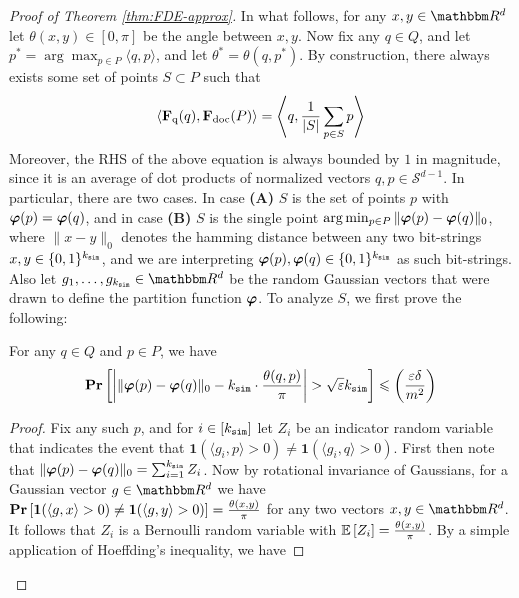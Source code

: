 \begin{proof}[Proof of Theorem \ref{thm:FDE-approx}]
 In what follows, for any $x,y \in \R^d$ let $\theta(x,y) \in [0, \pi]$ be the angle between $x,y$.  Now fix any $q \in Q$, and let $p^* = \arg \max_{p \in P} \langle q,p\rangle$, and let $\theta^* = \theta(q,p^*)$.  By construction, there always exists some set of points $S \subset P$ such that 
\[\langle \mathbf{F}_{\text{q}}(q) , \mathbf{F}_{\text{doc}}(P) \rangle  =\left\langle q, \frac{1}{|S|} \sum_{p \in S} p \right\rangle \] 
Moreover, the RHS of the above equation is always bounded by $1$ in magnitude, since it is an average of dot products of normalized vectors $q,p \in \mathcal{S}^{d-1}$. In particular, there are two cases. In case \textbf{(A)} $S$ is the set of points $p$ with $\boldsymbol{\varphi}(p) = \boldsymbol{\varphi}(q)$, and in case \textbf{(B)} $S$ is the single point $\arg \min_{p \in P} \|\boldsymbol{\varphi}(p) - \boldsymbol{\varphi}(q)\|_0$, where $\|x-y\|_0$ denotes the hamming distance between any two bit-strings $x,y \in \{0,1\}^{k_{\texttt{sim}}}$, and we are interpreting $\boldsymbol{\varphi}(p), \boldsymbol{\varphi}(q)\in \{0,1\}^{k_{\texttt{sim}}}$ as such bit-strings. Also let $g_1,\dots,g_{\ksim} \in \R^d$ be the random Gaussian vectors that were drawn to define the partition function $\boldsymbol{\varphi}$.  To analyze $S$, we first prove the following:
\begin{claim}\label{claim:inner1}
 For any $q \in Q$ and $p \in P$, we have 
 \[\operatorname{{\bf Pr}}\left[ \left| \|\boldsymbol{\varphi}(p) - \boldsymbol{\varphi}(q)\|_0 -  k_{\texttt{sim}} \cdot \frac{\theta(q,p)}{\pi} \right|  >  \sqrt{\varepsilon} k_{\texttt{sim}} \right] \leqslant \left(\frac{\varepsilon\delta }{m^2}\right) \]
\end{claim}
\begin{proof}
Fix any such $p$, and for $i \in [k_{\texttt{sim}}]$ let $Z_i$ be an indicator random variable that indicates the event that $ \mathbf{1}(\langle g_i , p\rangle > 0) \neq \mathbf{1}(\langle g_i , q\rangle > 0)$. 
First then note that $\|\boldsymbol{\varphi}(p) - \boldsymbol{\varphi}(q)\|_0 =\sum_{i=1}^{k_{\texttt{sim}}} Z_i$. Now by rotational invariance of Gaussians, for a Gaussian vector $g \in \R^d$  we have $\operatorname{{\bf Pr}}\left[ \mathbf{1}(\langle g, x\rangle > 0) \neq \mathbf{1}(\langle g, y\rangle> 0) \right] = \frac{\theta(x,y)}{\pi}$ for any two vectors $x,y \in \R^d$. It follows that $Z_i$ is a Bernoulli random variable with $\mathop{ \mathbb{E}\left[ Z_i \right]} = \frac{\theta(x,y)}{\pi}$. By a simple application of Hoeffding's inequality, we have


\end{proof}
\end{proof}
